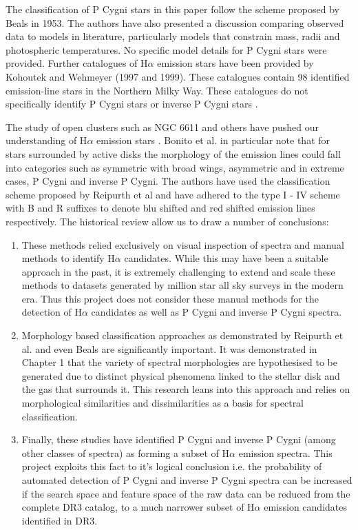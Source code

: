 The classification of P Cygni stars in this paper follow the scheme proposed by Beals in 1953\cite{1953PDAO....9....1B}. The authors have also presented a discussion comparing observed data to models in literature, particularly models that constrain mass, radii and photospheric temperatures. No specific model details for P Cygni stars were provided. Further catalogues of H$\alpha$ emission stars have been provided by Kohoutek and Wehmeyer (1997 and 1999). These catalogues contain 98 identified emission-line stars in the Northern Milky Way. These catalogues do not specifically identify P Cygni stars or inverse P Cygni stars \cite{kohoutek1999catalogue}.

The study of open clusters such as NGC 6611 and others have pushed our understanding of H$\alpha$ emission stars \cite{bonito2013spectroscopic,traven2015gaia}. Bonito et al. in particular note that for stars surrounded by active disks the morphology of the emission lines could fall into categories such as symmetric with broad wings, asymmetric and in extreme cases, P Cygni and inverse P Cygni. The authors have used the classification scheme proposed by Reipurth et al and have adhered to the type I - IV scheme with B and R suffixes to denote blu shifted and red shifted emission lines respectively. The historical review allow us to draw a number of conclusions:

\begin{enumerate}
\item These methods relied exclusively on visual inspection of spectra and manual methods to identify H$\alpha$ candidates. While this may have been a suitable approach in the past, it is extremely challenging to extend and scale these methods to datasets generated by million star all sky surveys in the modern era. Thus this project does not consider these manual methods for the detection of H$\alpha$ candidates as well as P Cygni and inverse P Cygni spectra. 

\item Morphology based classification approaches as demonstrated by Reipurth et al. and even Beals are significantly important. It was demonstrated in Chapter 1 that the variety of spectral morphologies are hypothesised to be generated due to distinct physical phenomena linked to the stellar disk and the gas that surrounds it. This research leans into this approach and relies on morphological similarities and dissimilarities as a basis for spectral classification.

\item Finally, these studies have identified P Cygni and inverse P Cygni (among other classes of spectra) as forming a subset of H$\alpha$ emission spectra. This project exploits this fact to it's logical conclusion i.e. the probability of automated detection of P Cygni and inverse P Cygni spectra can be increased if the search space and feature space of the raw data can be reduced from the complete DR3 catalog, to a much narrower subset of H$\alpha$ emission candidates identified in DR3.
\end{enumerate}

